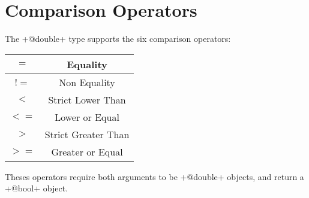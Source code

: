 \section{Comparison Operators}

The \ggs+@double+ type supports the six comparison operators:\newline

\begin{tabular}{|c|c|}
\hline
$=$ & Equality \\
\hline
$!=$ & Non Equality \\
\hline
$<$  & Strict Lower Than \\
\hline
$<=$  & Lower or Equal \\
\hline
$>$  & Strict Greater Than \\
\hline
$>=$  & Greater or Equal \\
\hline
\end{tabular}

Theses operators require both arguments to be \ggs+@double+ objects, and return a \ggs+@bool+ object.


